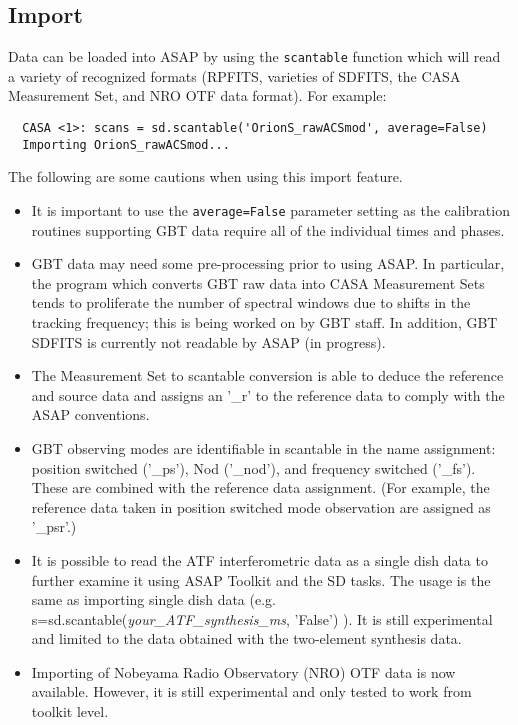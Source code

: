 \subsection{Import}
\label{subsection:sd.asap.import}

Data can be loaded into ASAP by using the {\tt scantable} function
which will read a variety of recognized formats (RPFITS, varieties of
SDFITS, the CASA Measurement Set, and NRO OTF data format). For example:


\small
\begin{verbatim}
  CASA <1>: scans = sd.scantable('OrionS_rawACSmod', average=False)
  Importing OrionS_rawACSmod...
\end{verbatim}
\normalsize

The following are some cautions when using this import feature.

\begin{itemize}
\item It is important to use the {\tt average=False} parameter
setting as the calibration routines supporting GBT data require all of
the individual times and phases.

\item GBT data may need some pre-processing prior to using
ASAP. In particular, the program which converts GBT raw data into CASA
Measurement Sets tends to proliferate the number of spectral windows
due to shifts in the tracking frequency; this is being worked on by
GBT staff. In addition, GBT SDFITS is currently not readable by ASAP
(in progress).

\item The Measurement Set to scantable conversion is able to deduce
the reference and source data and assigns an '\_r' to the reference
data to comply with the ASAP conventions.

\item GBT observing modes are identifiable in scantable in the
name assignment: position switched ('\_ps'), Nod ('\_nod'), and
frequency switched ('\_fs'). These are combined with the reference data
assignment. (For example, the reference data taken in position
switched mode observation are assigned as '\_psr'.)

\item It is possible to read the ATF interferometric
data as a single dish data to further examine it using ASAP Toolkit and
the SD tasks. The usage is the same as importing single
dish data (e.g. s=sd.scantable({\it your\_ATF\_synthesis\_ms}, 'False') ). 
It is still experimental and limited to the data obtained with the 
two-element synthesis data.

\item  Importing of Nobeyama Radio Observatory (NRO) OTF data is now available.
However, it is still experimental and only tested to work from toolkit level.
\end{itemize}


